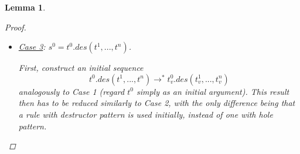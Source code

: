 \documentclass[11pt]{article} %
\newtheorem{lemma}{Lemma}
\begin{document}
\begin{lemma}
\begin{proof}
\begin{itemize}
Use the induction hypothesis to reduce the immediate subterms of $t[\sigma]$ to values. By the same argument as in the last paragraph, it can be seen that, if $t[\sigma]$ reduces to something at all, this is equivalent to it.

This process can be repeated until a value obtains; it is equivalent to $s^0$.

\item \underline{Case 3}: $s^0 = t^0.des(t^1, ..., t^n)$.

First, construct an initial sequence
\begin{equation*}
 t^0.des(t^1, ..., t^n) \longrightarrow^*  t^0_v.des(t^1_v, ..., t^n_v)
\end{equation*}
analogously to Case 1 (regard $t^0$ simply as an initial argument). This result then has to be reduced similarly to Case 2, with the only difference being that a rule with destructor pattern is used initially, instead of one with hole pattern.

\end{itemize}

\end{proof}

\end{lemma}
\end{document}
